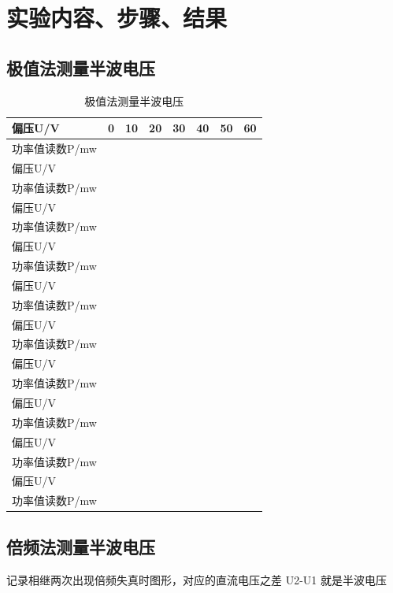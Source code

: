 \documentclass[UTF8]{ctexart}
\begin{document}
\section{实验内容、步骤、结果}
\subsection{极值法测量半波电压}
\begin{table}
	\caption{极值法测量半波电压}
	\label{jizhifa}
	\begin{tabularx}{\textwidth}{|X|Y|Y|Y|Y|Y|Y|Y|}
		\hline
		偏压U/V&0&10&20&30&40&50&60\\\hline
		功率值读数P/mw& & & & & & &\\\hline	
		偏压U/V& & & & & & & \\\hline
		功率值读数P/mw& & & & & & &\\\hline
		偏压U/V& & & & & & & \\\hline
		功率值读数P/mw& & & & & & &\\\hline
		偏压U/V& & & & & & & \\\hline
		功率值读数P/mw& & & & & & &\\\hline
		偏压U/V& & & & & & & \\\hline
		功率值读数P/mw& & & & & & &\\\hline
		偏压U/V& & & & & & & \\\hline
		功率值读数P/mw& & & & & & &\\\hline
		偏压U/V& & & & & & & \\\hline
		功率值读数P/mw& & & & & & &\\\hline
		偏压U/V& & & & & & & \\\hline
		功率值读数P/mw& & & & & & &\\\hline
		偏压U/V& & & & & & & \\\hline
		功率值读数P/mw& & & & & & &\\\hline
		偏压U/V& & & & & & & \\\hline
		功率值读数P/mw& & & & & & &\\\hline
	\end{tabularx}
\end{table}
\subsection{倍频法测量半波电压}
记录相继两次出现倍频失真时图形，对应的直流电压之差 U2-U1 就是半波电压
\end{document}
